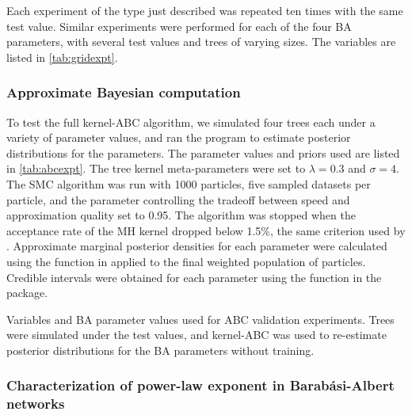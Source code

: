 Each experiment of the type just described was repeated ten times with the same
test value. Similar experiments were performed for each of the four \gls{BA}
parameters, with several test values and trees of varying sizes. The variables
are listed in \cref{tab:gridexpt}.

\subsubsection*{Approximate Bayesian computation}

To test the full kernel-\gls{ABC} algorithm, we simulated four trees each under
a variety of parameter values, and ran the  program to
estimate posterior distributions for the parameters. The parameter values and
priors used are listed in \ref{tab:abcexpt}. The tree kernel meta-parameters
were set to $\lambda = 0.3$ and $\sigma = 4$. The \gls{SMC} algorithm was run
with 1000 particles, five sampled datasets per particle, and the parameter
controlling the tradeoff between speed and approximation quality
\textcite[called ``$\alpha$'' in][]{del2012adaptive} set to 0.95. The algorithm
was stopped when the acceptance rate of the \gls{MH} kernel dropped below
1.5\%, the same criterion used by \citeauthor{del2012adaptive}. Approximate
marginal posterior densities for each parameter were calculated using the
 function in  applied to the final weighted
population of particles. Credible intervals were obtained for each parameter
using the  function in the  package.

\begin{table}[ht]
  \centering
  
  \caption[Variables used in grid search experiments]
  {
    Variables and \gls{BA} parameter values used for \gls{ABC} validation
    experiments. Trees were simulated under the test values, and
    kernel-\gls{ABC} was used to re-estimate posterior distributions for the
    \gls{BA} parameters without training.
  }
  \label{tab:abcexpt}
\end{table}

\subsubsection*{Characterization of power-law exponent in Barab\'asi-Albert networks}

